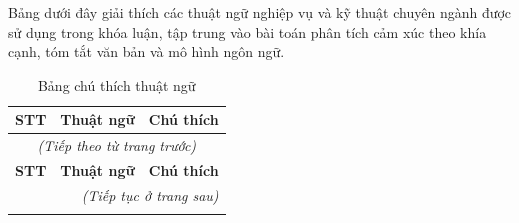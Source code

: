 \documentclass[12pt,a4paper]{report}
\begin{document}
Bảng dưới đây giải thích các thuật ngữ nghiệp vụ và kỹ thuật chuyên ngành được sử dụng trong khóa luận, tập trung vào bài toán phân tích cảm xúc theo khía cạnh, tóm tắt văn bản và mô hình ngôn ngữ.



\begin{longtable}{|p{}|p{}|p{}|}

\caption{Bảng chú thích thuật ngữ}\label{tab:glossary}\\

\hline

\textbf{STT} & \textbf{Thuật ngữ} & \textbf{Chú thích} \\

\hline

\endfirsthead

\multicolumn{3}{c}{\textit{(Tiếp theo từ trang trước)}} \\

\hline

\textbf{STT} & \textbf{Thuật ngữ} & \textbf{Chú thích} \\

\hline

\endhead

\hline

\multicolumn{3}{r}{\textit{(Tiếp tục ở trang sau)}} \\

\hline

\endfoot

\hline

\endlastfoot


\end{longtable}
\end{document}
